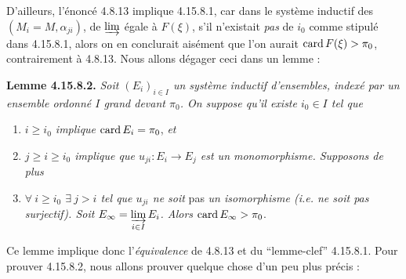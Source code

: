 D'ailleurs, l'énoncé 4.8.13 implique 4.15.8.1, car dans le système inductif des $(M_i = M, \alpha_{ji})$, de $\varinjlim$ égale à $F(\xi)$, s'il n'existait \textit{pas} de $i_0$ comme stipulé dans 4.15.8.1, alors on en conclurait aisément que l'on aurait $\operatorname{card} F(\xi) > \pi_0$, contrairement à 4.8.13. Nous allons dégager ceci dans un lemme :

\textbf{Lemme 4.15.8.2.} \textit{Soit $(E_i)_{i\in I}$ un système inductif d'ensembles, indexé par un ensemble ordonné $I$ grand devant $\pi_0$. On suppose qu'il existe $i_0 \in I$ tel que}
\begin{enumerate}[nosep]
\item[\textit{a)}] \textit{$i \geqslant i_0$ implique} $\operatorname{card} E_i = \pi_0$, \textit{et}
\item[\textit{b)}] \textit{$j \geqslant i \geqslant i_0$ implique que $u_{ji} : E_i \longrightarrow E_j$ est un monomorphisme. Supposons de plus}
\item[\textit{c)}] \textit{$\forall\ i \geqslant i_0$ $\exists\ j > i$ tel que $u_{ji}$ ne soit} pas \textit{un isomorphisme (i.e. ne soit pas surjectif). Soit $E_\infty = \varinjlim\limits_{i\in I} E_i$. Alors} $\operatorname{card} E_\infty > \pi_0$.
\end{enumerate}
Ce lemme implique donc l'\textit{équivalence} de 4.8.13 et du “lemme-clef” 4.15.8.1. Pour prouver 4.15.8.2, nous allons prouver quelque chose d'un peu plus précis :

